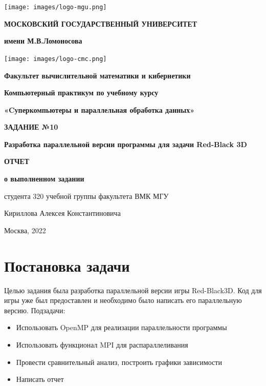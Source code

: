 \documentclass[./import.tex]{subfiles}
\begin{document}
\begin{titlepage}
\centering\noindent
{
\begin{minipage}{0.1\textwidth}
\texttt{[image: images/logo-mgu.png]}
\end{minipage}
\hfill
\begin{minipage}{0.77\textwidth}
\begin{center}
\textbf{МОСКОВСКИЙ ГОСУДАРСТВЕННЫЙ УНИВЕРСИТЕТ}\par
\textbf{имени М.В.Ломоносова}\par
\end{center}
\end{minipage}
\hfill
\begin{minipage}{0.1\textwidth}
\texttt{[image: images/logo-cmc.png]}
\end{minipage}
}\par
{
\textbf{Факультет вычислительной математики и кибернетики}\par
\nointerlineskip
\noindent\makebox[\linewidth]{\rule{\textwidth}{0.4pt}}
}
\vfill
{
\Large{\textbf{Компьютерный практикум по учебному курсу}}\par
\Large{\textbf{«Cуперкомпьютеры и параллельная обработка данных»}}\par
}
\vfill
{
\Huge{\textbf{ЗАДАНИЕ №10}}\par
\Large{\textbf{Разработка параллельной версии программы для задачи Red-Black 3D}}\par
\par
}
\vfill
{
\Large{\textbf{ОТЧЕТ}}\par
\Large{\textbf{о выполненном задании}}\par
\Large{студента 320 учебной группы факультета ВМК МГУ}\par
\Large{Кириллова Алексея Константиновича
\par}
}
\vfill
{\Large Москва, 2022}
\end{titlepage}
\tableofcontents

\newpage
\section{Постановка задачи}
Целью задания была разработка параллельной версии игры Red-Black3D. Код для игры уже был предоставлен и необходимо было написать его параллельную версию. Подзадачи:
\begin{itemize}
    \item Использовать OpenMP для реализации параллельности программы
    \item Использовать функционал MPI для распараллеливания
    \item Провести сравнительный анализ, построить графики зависимости
    \item Написать отчет
\end{itemize}
\end{document}
